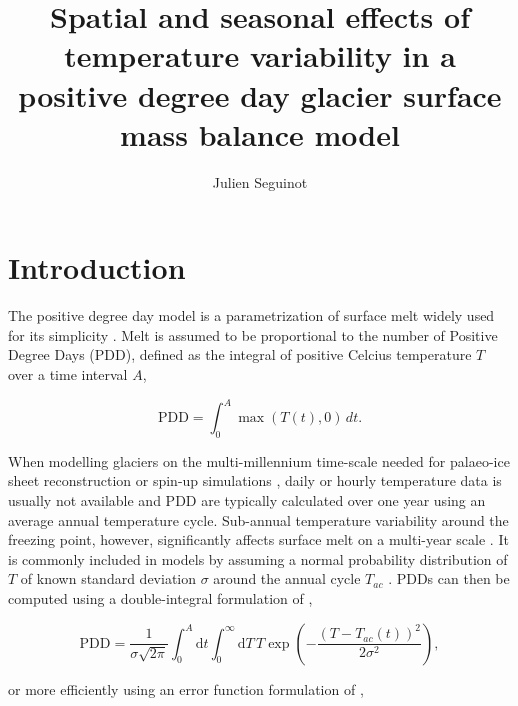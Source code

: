 \documentclass[review]{igs}
\begin{document}
\title[Temperature variability in a positive degree day model]{Spatial and seasonal effects of temperature variability in a positive degree day glacier surface mass balance model}
\author[J. Seguinot]{Julien Seguinot}

\maketitle


\section{Introduction}

The positive degree day model is a parametrization of surface melt widely used for its simplicity \citep{hock-2003}. Melt is assumed to be proportional to the number of Positive Degree Days (PDD), defined as the integral of positive Celcius temperature $T$ over a time interval $A$,

\begin{equation} \label{eq:pdd}
  \mathrm{PDD} = \int_{0}^{A}\max(T(t),0)\,dt.
\end{equation}

When modelling glaciers on the multi-millennium time-scale needed for palaeo-ice sheet reconstruction or spin-up simulations \citep[e.g.][]{charbit-etal-2013}, daily or hourly temperature data is usually not available and PDD are typically calculated over one year using an average annual temperature cycle. Sub-annual temperature variability around the freezing point, however, significantly affects surface melt on a multi-year scale \citep{arnold-mackay-1964}. It is commonly included in models by assuming a normal probability distribution of $T$ of known standard deviation $\sigma$ around the annual cycle $T_{ac}$ \citep{braithwaite-1984}. PDDs can then be computed using a double-integral formulation of \citet{reeh-1991},

\begin{equation} \label{eq:reeh}
  \mathrm{PDD} = \frac{1}{\sigma\sqrt{2\pi}}
    \int_{0}^{A} \mathrm{d}t
    \int_{0}^{\infty} \mathrm{d}T \,
    T \exp\left({-\frac{(T-T_{ac}(t))^2}{2\sigma^2}}\right),
\end{equation}

or more efficiently using an error function formulation of \citet{calov-greve-2005},
\end{document}
